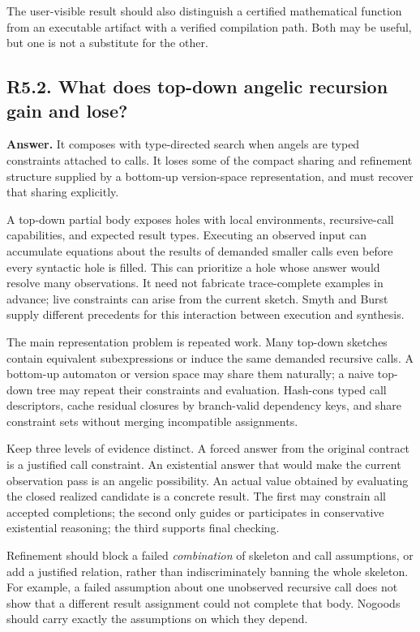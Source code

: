 \documentclass[11pt,a4paper]{article}
\newcommand{\question}[2]{\subsection{#1. #2}\label{q:#1}}
\theoremstyle{definition}
\theoremstyle{remark}
\begin{document}
The user-visible result should also distinguish a certified mathematical function from an executable artifact with a verified compilation path. Both may be useful, but one is not a substitute for the other.

\question{R5.2}{What does top-down angelic recursion gain and lose?}

\textbf{Answer.} It composes with type-directed search when angels are typed constraints attached to calls. It loses some of the compact sharing and refinement structure supplied by a bottom-up version-space representation, and must recover that sharing explicitly.

A top-down partial body exposes holes with local environments, recursive-call capabilities, and expected result types. Executing an observed input can accumulate equations about the results of demanded smaller calls even before every syntactic hole is filled. This can prioritize a hole whose answer would resolve many observations. It need not fabricate trace-complete examples in advance; live constraints can arise from the current sketch. Smyth and Burst supply different precedents for this interaction between execution and synthesis.\cite{smyth,burst}

The main representation problem is repeated work. Many top-down sketches contain equivalent subexpressions or induce the same demanded recursive calls. A bottom-up automaton or version space may share them naturally; a naive top-down tree may repeat their constraints and evaluation. Hash-cons typed call descriptors, cache residual closures by branch-valid dependency keys, and share constraint sets without merging incompatible assignments.

Keep three levels of evidence distinct. A forced answer from the original contract is a justified call constraint. An existential answer that would make the current observation pass is an angelic possibility. An actual value obtained by evaluating the closed realized candidate is a concrete result. The first may constrain all accepted completions; the second only guides or participates in conservative existential reasoning; the third supports final checking.

Refinement should block a failed \emph{combination} of skeleton and call assumptions, or add a justified relation, rather than indiscriminately banning the whole skeleton. For example, a failed assumption about one unobserved recursive call does not show that a different result assignment could not complete that body. Nogoods should carry exactly the assumptions on which they depend.
\end{document}
